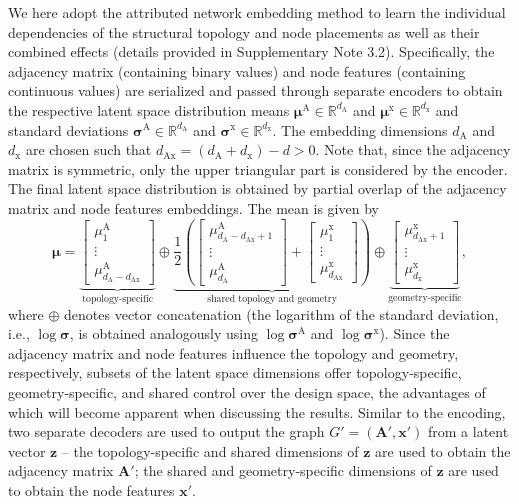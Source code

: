 \documentclass[fleqn,10pt]{wlscirep}
\newcommand{\boldface}[1]{\boldsymbol{#1}}
\newcommand{\bfx}{\boldface{x}}
\newcommand{\bfz}{\boldface{z}}
\newcommand{\bfA}{\boldface{A}}
\newcommand{\bfmu}{\boldsymbol{\mu}}
\newcommand{\bfsigma}{\boldsymbol{\sigma}}
\newcommand{\Rset}{\mathbb{R}}
\newcommand{\be}{\begin{equation}}
\newcommand{\ee}{\end{equation}}
\begin{document}
We here adopt the attributed network embedding method\cite{lerique2020joint} to learn the individual dependencies of the structural topology and node placements as well as their combined effects (details provided in Supplementary Note 3.2). Specifically, the adjacency matrix (containing binary values) and node features (containing continuous values) are serialized and passed through separate encoders to obtain the respective latent space distribution means  $\bfmu^\text{A}\in \Rset^{d_\text{A}}$ and $\bfmu^\text{x}\in\Rset^{d_\text{x}}$ and standard deviations $\bfsigma^\text{A}\in \Rset^{d_\text{A}}$ and $\bfsigma^\text{x}\in\Rset^{d_\text{x}}$. The embedding dimensions $d_\text{A}$ and $d_\text{x}$ are chosen such that \mbox{$d_\text{Ax} = (d_\text{A} + d_\text{x}) - d > 0$}. Note that, since the adjacency matrix is symmetric, only the upper triangular part is considered by the encoder. The final latent space distribution is obtained by partial overlap of the adjacency matrix and node features embeddings. The mean is given by
\be
\bfmu = 
\underbrace{
\begin{bmatrix}
\mu^\text{A}_1\\ \vdots \\ \mu^\text{A}_{d_\text{A}-d_\text{Ax}}
\end{bmatrix}
}_{\text{topology-specific}}
\oplus 
\underbrace{
\frac{1}{2}
\left(
\begin{bmatrix}
\mu^\text{A}_{d_\text{A}-d_\text{Ax}+1}\\ \vdots \\ \mu^\text{A}_{d_\text{A}}
\end{bmatrix}
+
\begin{bmatrix}
\mu^\text{x}_{1}\\ \vdots \\ \mu^\text{x}_{d_\text{Ax}}
\end{bmatrix}
\right)
}_{\text{shared topology and geometry}}
\oplus 
\underbrace{
\begin{bmatrix}
\mu^\text{x}_{d_\text{Ax}+1}\\ \vdots \\ \mu^\text{x}_{d_\text{x}}
\end{bmatrix}
}_{\text{geometry-specific}}
, 
\ee
where $\oplus$ denotes vector concatenation (the logarithm of the standard deviation, i.e., $\log\bfsigma$, is obtained analogously using $\log\bfsigma^\text{A}$ and $\log\bfsigma^\text{x}$). Since the adjacency matrix and node features influence the topology and geometry, respectively, subsets of the latent space dimensions offer topology-specific, geometry-specific, and shared control over the design space, the advantages of which will become apparent when discussing the results. Similar to the encoding, two separate decoders are used to output the graph $G'=(\bfA',\bfx')$ from a latent vector $\bfz$ -- the topology-specific and shared dimensions of $\bfz$ are used to obtain the adjacency matrix $\bfA'$; the shared and geometry-specific dimensions of $\bfz$ are used to obtain the node features $\bfx'$.
\end{document}
